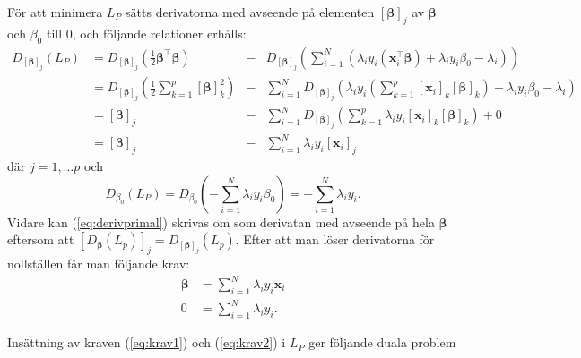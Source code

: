 \documentclass[a4paper, 12pt]{report}
\theoremstyle{definition}
\theoremstyle{remark}
\newcommand{\bfbeta}{{\boldsymbol{\beta}}}
\newcommand{\bfx}{\mathbf{x}}
\begin{document}
För att minimera $L_P$ sätts derivatorna med avseende på elementen $\left[\bfbeta\right]_j$ av $\bfbeta$ och $\beta_0$ till 0, och följande relationer erhålls:
\begin{equation}\label{eq:derivprimal}
\begin{aligned}
	D_{ \left[\bfbeta\right]_j } \left(L_P\right) &= D_{ \left[\bfbeta\right]_j } \left( \frac{1}{2} \bfbeta^\intercal \bfbeta \right) &- &D_{ \left[\bfbeta\right]_j } \left( \sum_{i=1}^{N} \left( \lambda_i y_i \left( \bfx_i^\intercal\bfbeta \right) + \lambda_i y_i \beta_0 - \lambda_i \right)\right)\\
	&= D_{ \left[\bfbeta\right]_j } \left( \frac{1}{2} \sum_{k=1}^{p} \left[\bfbeta\right]_k^2 \right) &- &\sum_{i=1}^{N} D_{ \left[\bfbeta\right]_j } \left(  \lambda_i y_i \left(\sum_{k=1}^{p}\left[\mathbf{x}_i\right]_k\left[\bfbeta\right]_k \right) + \lambda_i y_i \beta_0-\lambda_i \right)\\
	&= [\bfbeta]_j &- &\sum_{i=1}^{N} D_{ \left[\bfbeta\right]_j } \left( \sum_{k=1}^{p} \lambda_i y_i \left[\mathbf{x}_i\right]_k\left[\bfbeta\right]_k \right) + 0\\
	&= [\bfbeta]_j &- &\sum_{i=1}^{N}\lambda_i y_i \left[ \mathbf{x}_i \right]_j
\end{aligned}
\end{equation}
där $j=1,\dots p$ och
\begin{equation*}
	D_{\beta_0}\left(L_P\right) = D_{\beta_0}\left( -\sum_{i=1}^{N} \lambda_i y_i \beta_0 \right) = -\sum_{i=1}^{N} \lambda_i y_i.
\end{equation*}
Vidare kan (\ref{eq:derivprimal}) skrivas om som derivatan med avseende på hela $\bfbeta$ eftersom att $ \left[ D_{ \bfbeta }\left(L_p\right) \right]_j = D_{\left[ \bfbeta \right]_j}\left(L_p\right) $. Efter att man löser derivatorna för nollställen får man följande krav:
\begin{align}\label{eq:krav1}
	\bfbeta &= \sum_{i=1}^{N} \lambda_i y_i \mathbf{x}_i\\
	0 &= \sum_{i=1}^{N} \lambda_i y_i.\label{eq:krav2}
\end{align}

Insättning av kraven (\ref{eq:krav1}) och (\ref{eq:krav2}) i $L_P$ ger följande duala problem
\end{document}
